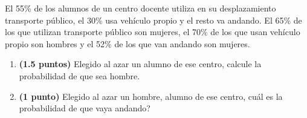 
El 55\% de los alumnos de un centro docente utiliza en su desplazamiento transporte público, el 30\% usa vehículo propio y el resto va andando. El 65\% de los que utilizan transporte público son mujeres, el 70\% de los que usan vehículo propio son hombres y el 52\% de los que van andando son mujeres.
\begin{enumerate}[label=\alph*)]
\item \textbf{(1.5 puntos)} Elegido al azar un alumno de ese centro, calcule la probabilidad de que sea hombre.
\item \textbf{(1 punto)} Elegido al azar un hombre, alumno de ese centro, \textquestiondown{}cuál es la probabilidad de que vaya andando?
\end{enumerate}

